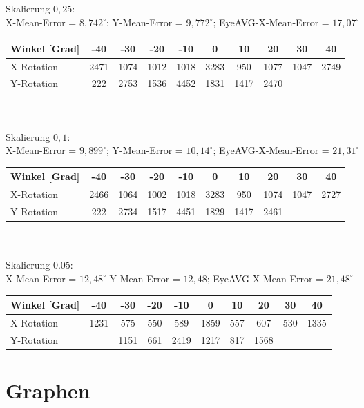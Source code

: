 \newpage
Skalierung $0,25$:\\
X-Mean-Error = $8,742^\circ$; Y-Mean-Error = $9,772^\circ$; EyeAVG-X-Mean-Error = $17,07^\circ$\\
\begin{tabular}{|l|c|c|c|c|c|c|c|c|c|}
\hline 
Winkel [Grad]&-40&-30&-20&-10&0&10&20&30&40\\
\hline 
X-Rotation&2471&1074&1012&1018&3283&950&1077&1047&2749\\ 
\hline 
Y-Rotation&222&2753&1536&4452&1831&1417&2470&&\\
\hline
\end{tabular}\\\\
Skalierung $0,1$:\\
X-Mean-Error = $9,899^\circ$; Y-Mean-Error = $10,14^\circ$; EyeAVG-X-Mean-Error = $21,31^\circ$\\
\begin{tabular}{|l|c|c|c|c|c|c|c|c|c|}
\hline 
Winkel [Grad]&-40&-30&-20&-10&0&10&20&30&40\\
\hline 
X-Rotation&2466&1064&1002&1018&3283&950&1074&1047&2727\\ 
\hline 
Y-Rotation&222&2734&1517&4451&1829&1417&2461&&\\
\hline
\end{tabular}\\\\
Skalierung 0.05:\\
X-Mean-Error = $12,48^\circ$ Y-Mean-Error = $12,48$; EyeAVG-X-Mean-Error = $21,48^\circ$\\
\begin{tabular}{|l|c|c|c|c|c|c|c|c|c|}
\hline 
Winkel [Grad]&-40&-30&-20&-10&0&10&20&30&40\\
\hline 
X-Rotation&1231&575&550&589&1859&557&607&530&1335\\ 
\hline 
Y-Rotation&&1151&661&2419&1217&817&1568&&\\
\hline
\end{tabular}
\section{Graphen}